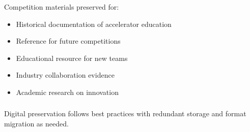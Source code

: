 \subsubsection{}
Competition materials preserved for:
\begin{itemize}[noitemsep]
    \item Historical documentation of accelerator education
    \item Reference for future competitions
    \item Educational resource for new teams
    \item Industry collaboration evidence
    \item Academic research on innovation
\end{itemize}

\subsubsection{}
Digital preservation follows best practices with redundant storage and format migration as needed.